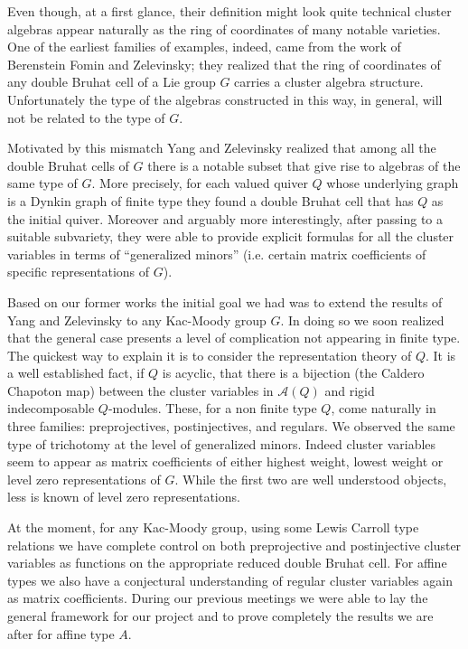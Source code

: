 \documentclass{amsart}
\begin{document}
  Even though, at a first glance, their definition might look quite technical cluster algebras appear naturally as the ring of coordinates of many notable varieties. 
  One of the earliest families of examples, indeed, came from the work of Berenstein Fomin and Zelevinsky; they realized that the ring of coordinates of any double Bruhat cell of a Lie group $G$ carries a cluster algebra structure. 
  Unfortunately the type of the algebras constructed in this way, in general, will not be related to the type of $G$. 

  Motivated by this mismatch Yang and Zelevinsky realized that among all the double Bruhat cells of $G$ there is a notable subset that give rise to algebras of the same type of $G$. 
  More precisely, for each valued quiver $Q$ whose underlying graph is a Dynkin graph of finite type they found a double Bruhat cell that has $Q$ as the initial quiver. 
  Moreover and arguably more interestingly, after passing to a suitable subvariety, they were able to provide explicit formulas for all the cluster variables in terms of ``generalized minors'' (i.e. certain matrix coefficients of specific representations of $G$).

  Based on our former works the initial goal we had was to extend the results of Yang and Zelevinsky to any Kac-Moody group $G$. 
  In doing so we soon realized that the general case presents a level of complication not appearing in finite type.
  The quickest way to explain it is to consider the representation theory of $Q$.
  It is a well established fact, if $Q$ is acyclic, that there is a bijection (the Caldero Chapoton map) between the cluster variables in $\mathcal{A}(Q)$ and rigid indecomposable $Q$-modules. 
  These, for a non finite type $Q$, come naturally in three families: preprojectives, postinjectives, and regulars.
  We observed the same type of trichotomy at the level of generalized minors. 
  Indeed cluster variables seem to appear as matrix coefficients of either highest weight, lowest weight or level zero representations of $G$.  
  While the first two are well understood objects, less is known of level zero representations.
  
  At the moment, for any Kac-Moody group, using some Lewis Carroll type relations we have complete control on both preprojective and  postinjective cluster variables as functions on the appropriate reduced double Bruhat cell.
  For affine types we also have a conjectural understanding of regular cluster variables again as matrix coefficients. 
  During our previous meetings we were able to lay the general framework for our project and to prove completely the results we are after for affine type $A$. 
\end{document}
